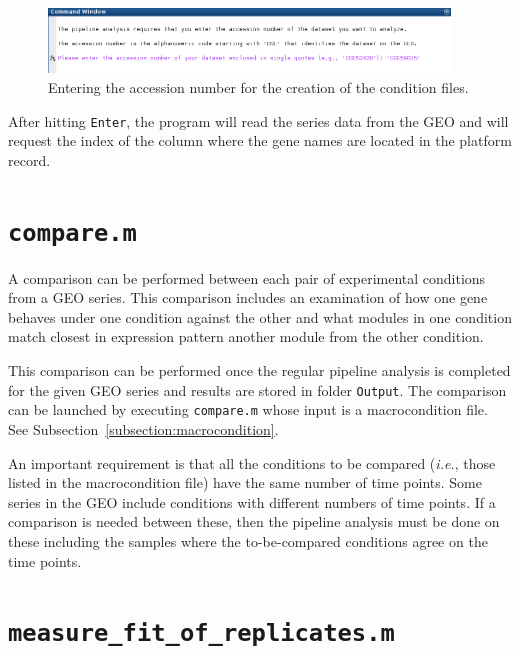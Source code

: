 \documentclass[final,letterpaper,12pt]{article}
\begin{document}
\begin{figure}
	\centering
	\includegraphics[width=0.95\textwidth]{create_input_files2}
	\caption{Entering the accession number for the creation of the condition files.}
	\label{fig:create_input_files2}
\end{figure}

\par After hitting \texttt{Enter}, the program will read the series data from the GEO and will request the index of the column where the gene names are located in the platform record.

\section{\texttt{compare.m}}

\par A comparison can be performed between each pair of experimental conditions from a GEO series. This comparison includes an examination of how one gene behaves under one condition against the other and what modules in one condition match closest in expression pattern another module from the other condition.

\par This comparison can be performed once the regular pipeline analysis is completed for the given GEO series and results are stored in folder \texttt{Output}. The comparison can be launched by executing \texttt{compare.m} whose input is a macrocondition file. See Subsection~\ref{subsection:macrocondition}.

\par An important requirement is that all the conditions to be compared (\textit{i.e.}, those listed in the macrocondition file) have the same number of time points. Some series in the GEO include conditions with different numbers of time points. If a comparison is needed between these, then the pipeline analysis must be done on these including the samples where the to-be-compared conditions agree on the time points.

\section{\texttt{measure\_fit\_of\_replicates.m}}
\label{section:between_replicate_noise_m}
\end{document}

